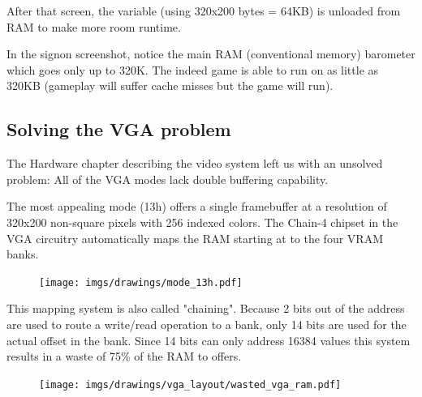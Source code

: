 \documentclass[book.tex]{subfiles}
\begin{document}
\begin{minipage}{\textwidth}

\end{minipage}
After that screen, the  variable (using 320x200 bytes = 64KB) is unloaded from RAM to make more room runtime.\\
\par
In the signon screenshot, notice the main RAM (conventional memory) barometer which goes only up to 320K. The indeed game is able to run on as little as 320KB (gameplay will suffer cache misses but the game will run).




















\subsection{Solving the VGA problem}
The Hardware chapter describing the video system left us with an unsolved problem: All of the VGA modes lack double buffering capability.\\
\par
 The most appealing mode (13h) offers a single framebuffer at a resolution of 320x200 non-square pixels with 256 indexed colors. The Chain-4 chipset in the VGA circuitry automatically maps the RAM starting at  to the four VRAM banks. 
 \par
 \begin{figure}[H]
\centering
      \texttt{[image: imgs/drawings/mode\_13h.pdf]}
\end{figure}

This mapping system is also called "chaining". Because 2 bits out of the address are used to route a write/read operation to a bank, only 14 bits are used for the actual offset in the bank. Since 14 bits can only address 16384 values this system results in a waste of 75\% of the RAM to offers.\\

\begin{figure}[H]
\centering
 \texttt{[image: imgs/drawings/vga\_layout/wasted\_vga\_ram.pdf]}
 \end{figure}
\end{document}
